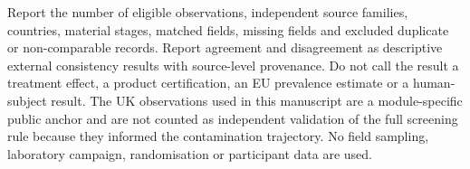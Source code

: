 \documentclass[pdflatex,sn-basic]{sn-jnl}
\begin{document}
\begin{appendices}
Report the number of eligible observations, independent source families, countries, material stages, matched fields, missing fields and excluded duplicate or non-comparable records. Report agreement and disagreement as descriptive external consistency results with source-level provenance. Do not call the result a treatment effect, a product certification, an EU prevalence estimate or a human-subject result. The UK observations used in this manuscript are a module-specific public anchor and are not counted as independent validation of the full screening rule because they informed the contamination trajectory. No field sampling, laboratory campaign, randomisation or participant data are used.

\end{appendices}
\end{document}
